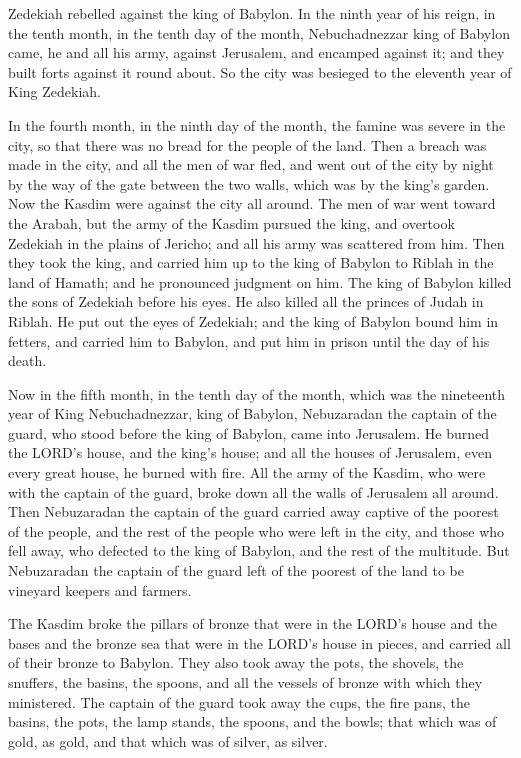 Zedekiah rebelled against the king of Babylon. \myverse{}In the ninth year of his reign, in the tenth month, in the tenth day of the month, Nebuchadnezzar king of Babylon came, he and all his army, against Jerusalem, and encamped against it; and they built forts against it round about. \myverse{}So the city was besieged to the eleventh year of King Zedekiah.


\myverse{}In the fourth month, in the ninth day of the month, the famine was severe in the city, so that there was no bread for the people of the land. \myverse{}Then a breach was made in the city, and all the men of war fled, and went out of the city by night by the way of the gate between the two walls, which was by the king’s garden. Now the Kasdim were against the city all around. The men of war went toward the Arabah, \myverse{}but the army of the Kasdim pursued the king, and overtook Zedekiah in the plains of Jericho; and all his army was scattered from him. \myverse{}Then they took the king, and carried him up to the king of Babylon to Riblah in the land of Hamath; and he pronounced judgment on him. \myverse{}The king of Babylon killed the sons of Zedekiah before his eyes. He also killed all the princes of Judah in Riblah. \myverse{}He put out the eyes of Zedekiah; and the king of Babylon bound him in fetters, and carried him to Babylon, and put him in prison until the day of his death.


\myverse{}Now in the fifth month, in the tenth day of the month, which was the nineteenth year of King Nebuchadnezzar, king of Babylon, Nebuzaradan the captain of the guard, who stood before the king of Babylon, came into Jerusalem. \myverse{}He burned the LORD’s house, and the king’s house; and all the houses of Jerusalem, even every great house, he burned with fire. \myverse{}All the army of the Kasdim, who were with the captain of the guard, broke down all the walls of Jerusalem all around. \myverse{}Then Nebuzaradan the captain of the guard carried away captive of the poorest of the people, and the rest of the people who were left in the city, and those who fell away, who defected to the king of Babylon, and the rest of the multitude. \myverse{}But Nebuzaradan the captain of the guard left of the poorest of the land to be vineyard keepers and farmers.


\myverse{}The Kasdim broke the pillars of bronze that were in the LORD’s house and the bases and the bronze sea that were in the LORD’s house in pieces, and carried all of their bronze to Babylon. \myverse{}They also took away the pots, the shovels, the snuffers, the basins, the spoons, and all the vessels of bronze with which they ministered. \myverse{}The captain of the guard took away the cups, the fire pans, the basins, the pots, the lamp stands, the spoons, and the bowls; that which was of gold, as gold, and that which was of silver, as silver.



